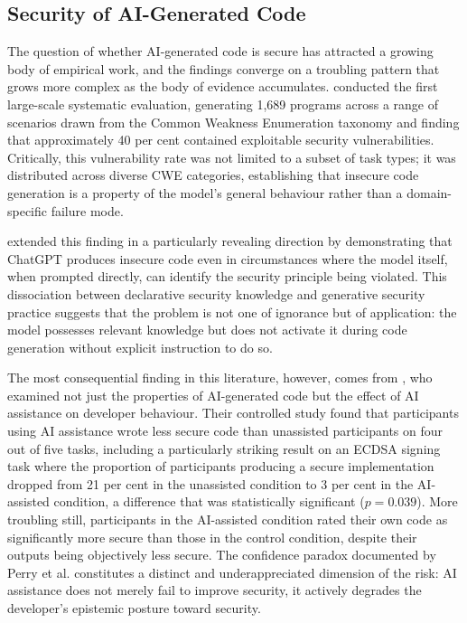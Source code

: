 \subsection{Security of AI-Generated Code}

The question of whether AI-generated code is secure has attracted a growing body of empirical work, and the findings converge on a troubling pattern that grows more complex as the body of evidence accumulates. \citet{pearce2022} conducted the first large-scale systematic evaluation, generating 1,689 programs across a range of scenarios drawn from the Common Weakness Enumeration taxonomy and finding that approximately 40 per cent contained exploitable security vulnerabilities. Critically, this vulnerability rate was not limited to a subset of task types; it was distributed across diverse CWE categories, establishing that insecure code generation is a property of the model's general behaviour rather than a domain-specific failure mode.

\citet{khoury2023} extended this finding in a particularly revealing direction by demonstrating that ChatGPT produces insecure code even in circumstances where the model itself, when prompted directly, can identify the security principle being violated. This dissociation between declarative security knowledge and generative security practice suggests that the problem is not one of ignorance but of application: the model possesses relevant knowledge but does not activate it during code generation without explicit instruction to do so.

The most consequential finding in this literature, however, comes from \citet{perry2023}, who examined not just the properties of AI-generated code but the effect of AI assistance on developer behaviour. Their controlled study found that participants using AI assistance wrote less secure code than unassisted participants on four out of five tasks, including a particularly striking result on an ECDSA signing task where the proportion of participants producing a secure implementation dropped from 21 per cent in the unassisted condition to 3 per cent in the AI-assisted condition, a difference that was statistically significant ($p = 0.039$). More troubling still, participants in the AI-assisted condition rated their own code as significantly more secure than those in the control condition, despite their outputs being objectively less secure. The confidence paradox documented by Perry et al. constitutes a distinct and underappreciated dimension of the risk: AI assistance does not merely fail to improve security, it actively degrades the developer's epistemic posture toward security.

